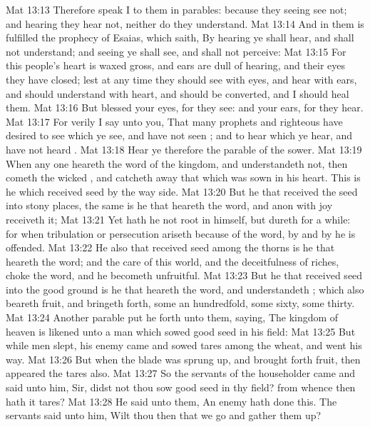 \vs Mat 13:13 Therefore speak I to them in parables: because they seeing see not; and hearing they hear not, neither do they understand.
\vs Mat 13:14 And in them is fulfilled the prophecy of Esaias, which saith, By hearing ye shall hear, and shall not understand; and seeing ye shall see, and shall not perceive:
\vs Mat 13:15 For this people's heart is waxed gross, and  ears are dull of hearing, and their eyes they have closed; lest at any time they should see with  eyes, and hear with  ears, and should understand with  heart, and should be converted, and I should heal them.
\vs Mat 13:16 But blessed  your eyes, for they see: and your ears, for they hear.
\vs Mat 13:17 For verily I say unto you, That many prophets and righteous  have desired to see  which ye see, and have not seen ; and to hear  which ye hear, and have not heard .
\vs Mat 13:18 Hear ye therefore the parable of the sower.
\vs Mat 13:19 When any one heareth the word of the kingdom, and understandeth  not, then cometh the wicked , and catcheth away that which was sown in his heart. This is he which received seed by the way side.
\vs Mat 13:20 But he that received the seed into stony places, the same is he that heareth the word, and anon with joy receiveth it;
\vs Mat 13:21 Yet hath he not root in himself, but dureth for a while: for when tribulation or persecution ariseth because of the word, by and by he is offended.
\vs Mat 13:22 He also that received seed among the thorns is he that heareth the word; and the care of this world, and the deceitfulness of riches, choke the word, and he becometh unfruitful.
\vs Mat 13:23 But he that received seed into the good ground is he that heareth the word, and understandeth ; which also beareth fruit, and bringeth forth, some an hundredfold, some sixty, some thirty.
\vs Mat 13:24 Another parable put he forth unto them, saying, The kingdom of heaven is likened unto a man which sowed good seed in his field:
\vs Mat 13:25 But while men slept, his enemy came and sowed tares among the wheat, and went his way.
\vs Mat 13:26 But when the blade was sprung up, and brought forth fruit, then appeared the tares also.
\vs Mat 13:27 So the servants of the householder came and said unto him, Sir, didst not thou sow good seed in thy field? from whence then hath it tares?
\vs Mat 13:28 He said unto them, An enemy hath done this. The servants said unto him, Wilt thou then that we go and gather them up?
